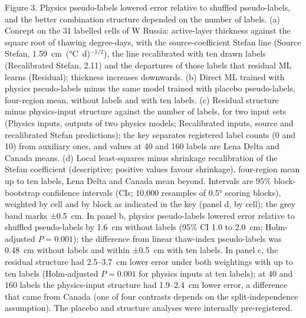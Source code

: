 \medskip

\noindent Figure 3. Physics pseudo-labels lowered error relative to shuffled pseudo-labels, and the better combination structure depended on the number of labels.
(a) Concept on the 31 labelled cells of W Russia: active-layer thickness against the square root of thawing degree-days, with the source-coefficient Stefan line (Source Stefan, 1.59~cm~(°C~d)$^{-1/2}$), the line recalibrated with ten drawn labels (Recalibrated Stefan, 2.11) and the departures of those labels that residual ML learns (Residual); thickness increases downwards.
(b) Direct ML trained with physics pseudo-labels minus the same model trained with placebo pseudo-labels, four-region mean, without labels and with ten labels.
(c) Residual structure minus physics-input structure against the number of labels, for two input sets (Physics inputs, outputs of two physics models; Recalibrated inputs, source and recalibrated Stefan predictions); the key separates registered label counts (0 and 10) from auxiliary ones, and values at 40 and 160 labels are Lena Delta and Canada means.
(d) Local least-squares minus shrinkage recalibration of the Stefan coefficient (descriptive; positive values favour shrinkage), four-region mean up to ten labels, Lena Delta and Canada mean beyond.
Intervals are 95\% block-bootstrap confidence intervals (CIs; 10,000 resamples of 0.5° scoring blocks), weighted by cell and by block as indicated in the key (panel d, by cell); the grey band marks ±0.5~cm.
In panel b, physics pseudo-labels lowered error relative to shuffled pseudo-labels by 1.6~cm without labels (95\% CI 1.0 to 2.0~cm; Holm-adjusted $P = 0.001$); the difference from linear thaw-index pseudo-labels was 0.48~cm without labels and within ±0.5~cm with ten labels.
In panel c, the residual structure had 2.5--3.7~cm lower error under both weightings with up to ten labels (Holm-adjusted $P = 0.001$ for physics inputs at ten labels); at 40 and 160 labels the physics-input structure had 1.9--2.4~cm lower error, a difference that came from Canada (one of four contrasts depends on the split-independence assumption).
The placebo and structure analyses were internally pre-registered.

